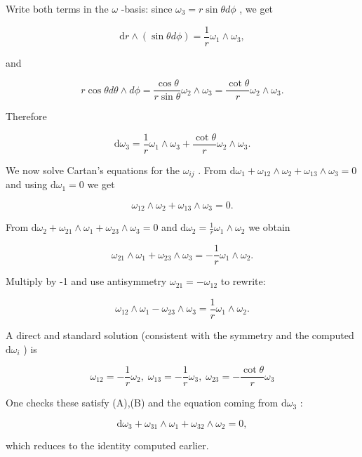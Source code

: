\documentclass[10pt]{article}
\begin{document}
Write both terms in the \(\omega\) -basis: since \({\omega }_{3} = r\sin {\theta d\phi }\) , we get

\[
\mathrm{d}r \land  \left( {\sin {\theta d\phi }}\right)  = \frac{1}{r}{\omega }_{1} \land  {\omega }_{3},
\]

and

\[
r\cos {\theta d\theta } \land  {d\phi } = \frac{\cos \theta }{r\sin \theta }{\omega }_{2} \land  {\omega }_{3} = \frac{\cot \theta }{r}{\omega }_{2} \land  {\omega }_{3}.
\]

Therefore

\[
\mathrm{d}{\omega }_{3} = \frac{1}{r}{\omega }_{1} \land  {\omega }_{3} + \frac{\cot \theta }{r}{\omega }_{2} \land  {\omega }_{3}.
\]

We now solve Cartan’s equations for the \({\omega }_{ij}\) . From \(\mathrm{d}{\omega }_{1} + {\omega }_{12} \land  {\omega }_{2} + {\omega }_{13} \land  {\omega }_{3} = 0\) and using \(\mathrm{d}{\omega }_{1} = 0\) we get

\[
{\omega }_{12} \land  {\omega }_{2} + {\omega }_{13} \land  {\omega }_{3} = 0. \tag{A}
\]

From \(\mathrm{d}{\omega }_{2} + {\omega }_{21} \land  {\omega }_{1} + {\omega }_{23} \land  {\omega }_{3} = 0\) and \(\mathrm{d}{\omega }_{2} = \frac{1}{r}{\omega }_{1} \land  {\omega }_{2}\) we obtain

\[
{\omega }_{21} \land  {\omega }_{1} + {\omega }_{23} \land  {\omega }_{3} =  - \frac{1}{r}{\omega }_{1} \land  {\omega }_{2}.
\]

Multiply by -1 and use antisymmetry \({\omega }_{21} =  - {\omega }_{12}\) to rewrite:

\[
{\omega }_{12} \land  {\omega }_{1} - {\omega }_{23} \land  {\omega }_{3} = \frac{1}{r}{\omega }_{1} \land  {\omega }_{2}. \tag{B}
\]

A direct and standard solution (consistent with the symmetry and the computed \(\mathrm{d}{\omega }_{i}\) ) is

\[
{\omega }_{12} =  - \frac{1}{r}{\omega }_{2},\;{\omega }_{13} =  - \frac{1}{r}{\omega }_{3},\;{\omega }_{23} =  - \frac{\cot \theta }{r}{\omega }_{3}
\]

One checks these satisfy (A),(B) and the equation coming from \(\mathrm{d}{\omega }_{3}\) :

\[
\mathrm{d}{\omega }_{3} + {\omega }_{31} \land  {\omega }_{1} + {\omega }_{32} \land  {\omega }_{2} = 0,
\]

which reduces to the identity computed earlier.
\end{document}
